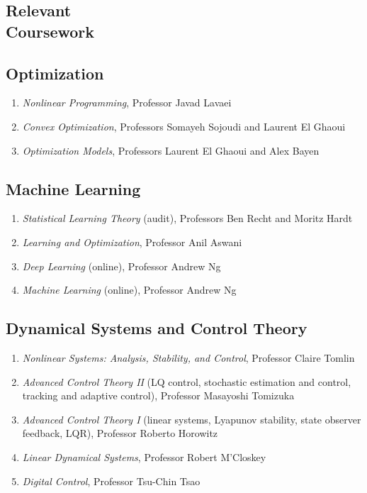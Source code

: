 \begin{coursework}
	\section{\texorpdfstring{Relevant \\[\baselineskip] Coursework}{Relevant Coursework}}
	\hfill\vspace*{-2\baselineskip}
	
	\subsection{Optimization}
	\begin{enumerate}[label={\arabic*.}]
		\item \textit{Nonlinear Programming}, Professor Javad Lavaei
		\item \textit{Convex Optimization}, Professors Somayeh Sojoudi and Laurent El Ghaoui
		\item \textit{Optimization Models}, Professors Laurent El Ghaoui and Alex Bayen
	\end{enumerate}
	
	\vspace*{\subsectionskip}
	
	\subsection{Machine Learning}
	\begin{enumerate}[label=\arabic*.]
		\item \textit{Statistical Learning Theory} (audit), Professors Ben Recht and Moritz Hardt
		\item \textit{Learning and Optimization}, Professor Anil Aswani
		\item \textit{Deep Learning} (online), Professor Andrew Ng
		\item \textit{Machine Learning} (online), Professor Andrew Ng
	\end{enumerate}
	
	\vspace*{\subsectionskip}
	
	\subsection{Dynamical Systems and Control Theory}
	\begin{enumerate}[label=\arabic*.]
		\item \textit{Nonlinear Systems: Analysis, Stability, and Control}, Professor Claire Tomlin
		\item \textit{Advanced Control Theory II} (LQ control, stochastic estimation and control, tracking and adaptive control), Professor Masayoshi Tomizuka
		\item \textit{Advanced Control Theory I} (linear systems, Lyapunov stability, state observer feedback, LQR), Professor Roberto Horowitz
		\item \textit{Linear Dynamical Systems}, Professor Robert M'Closkey
		\item \textit{Digital Control}, Professor Tsu-Chin Tsao
	\end{enumerate}
	

\end{coursework}

